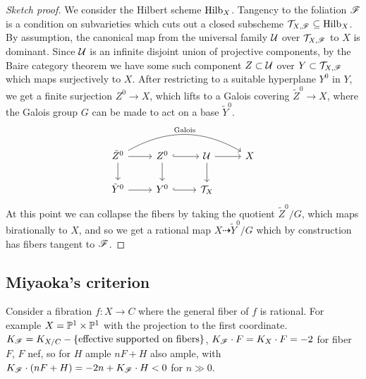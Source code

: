 \begin{proof}[Sketch proof]
    We consider the Hilbert scheme $\Hilb_X$. Tangency to the foliation $\scrF$
    is a condition on subvarieties which cuts out a closed subscheme
    $\calT_{X,\scrF}\subseteq\Hilb_X$. By assumption, the canonical map from the
    universal family $\calU$ over $\calT_{X,\scrF}$ to $X$ is dominant. Since
    $\calU$ is an infinite disjoint union of projective components, by the Baire
    category theorem we have some such component $Z\subset\calU$ over
    $Y\subset\calT_{X,\scrF}$ which maps surjectively to $X$. After restricting
    to a suitable hyperplane $Y^0$ in $Y$, we get a finite surjection
    $Z^0\to X$, which lifts to a Galois covering $\tilde Z^0\to X$, where the
    Galois group $G$ can be made to act on a base $\tilde Y^0$.
    \begin{equation*}
        \begin{tikzcd}
            \tilde Z^0 \ar[d] \ar[r]
                \ar[rrr,bend left,"\text{Galois}"] &
            Z^0 \ar[d] \ar[r,hook] &
            \calU \ar[d] \ar[r] & X \\
            \tilde Y^0 \ar[r] & Y^0 \ar[r,hook] & \calT_X
        \end{tikzcd}
    \end{equation*}
    At this point we can collapse the fibers by taking the quotient
    $\tilde Z^0/G$, which maps birationally to $X$, and so we get a rational map
    $X\dashrightarrow \tilde Y^0/G$ which by construction has fibers tangent to
    $\scrF$.
\end{proof}


\subsection{Miyaoka's criterion}


Consider a fibration $f:X\to C$ where the general fiber of $f$ is rational. For
example $X=\P^1\times\P^1$ with the projection to the first coordinate.
$K_\scrF=K_{X/C}-\{\text{effective supported on fibers}\}$,
$K_\scrF\cdot F=K_X\cdot F=-2$ for fiber $F$, $F$ nef, so for $H$ ample $nF+H$
also ample, with $K_\scrF\cdot(nF+H)=-2n+K_\scrF\cdot H<0$ for $n\gg0$.


